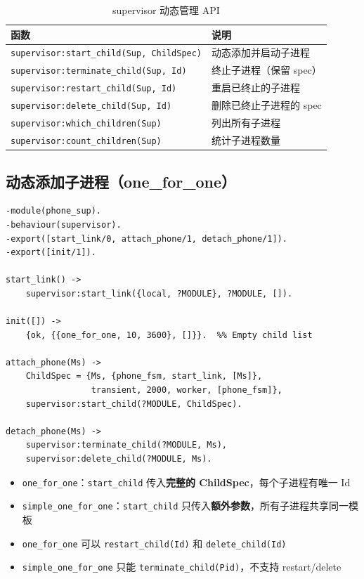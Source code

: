 \documentclass[a4paper,11pt]{article}
\begin{document}
\begin{table}[H]
\centering
\begin{tabular}{@{}ll@{}}
\toprule
\textbf{函数} & \textbf{说明} \\
\midrule
\texttt{supervisor:start\_child(Sup, ChildSpec)} & 动态添加并启动子进程 \\
\texttt{supervisor:terminate\_child(Sup, Id)} & 终止子进程（保留 spec） \\
\texttt{supervisor:restart\_child(Sup, Id)} & 重启已终止的子进程 \\
\texttt{supervisor:delete\_child(Sup, Id)} & 删除已终止子进程的 spec \\
\texttt{supervisor:which\_children(Sup)} & 列出所有子进程 \\
\texttt{supervisor:count\_children(Sup)} & 统计子进程数量 \\
\bottomrule
\end{tabular}
\caption{supervisor 动态管理 API}
\end{table}

\subsection{动态添加子进程（one\_for\_one）}

\begin{lstlisting}[style=erlangstyle, caption={phone\_sup.erl --- 动态添加完整 ChildSpec}]
-module(phone_sup).
-behaviour(supervisor).
-export([start_link/0, attach_phone/1, detach_phone/1]).
-export([init/1]).

start_link() ->
    supervisor:start_link({local, ?MODULE}, ?MODULE, []).

init([]) ->
    {ok, {{one_for_one, 10, 3600}, []}}.  %% Empty child list

attach_phone(Ms) ->
    ChildSpec = {Ms, {phone_fsm, start_link, [Ms]},
                 transient, 2000, worker, [phone_fsm]},
    supervisor:start_child(?MODULE, ChildSpec).

detach_phone(Ms) ->
    supervisor:terminate_child(?MODULE, Ms),
    supervisor:delete_child(?MODULE, Ms).
\end{lstlisting}

\begin{tipbox}
\begin{itemize}[leftmargin=1.5em]
    \item \texttt{one\_for\_one}：\texttt{start\_child} 传入\textbf{完整的 ChildSpec}，每个子进程有唯一 Id
    \item \texttt{simple\_one\_for\_one}：\texttt{start\_child} 只传入\textbf{额外参数}，所有子进程共享同一模板
    \item \texttt{one\_for\_one} 可以 \texttt{restart\_child(Id)} 和 \texttt{delete\_child(Id)}
    \item \texttt{simple\_one\_for\_one} 只能 \texttt{terminate\_child(Pid)}，不支持 restart/delete
\end{itemize}
\end{tipbox}
\end{document}
